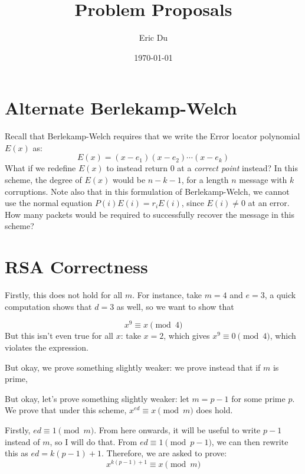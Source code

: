 \documentclass[10pt]{article}
\title{Problem Proposals}
\author{Eric Du}
\date{\today}
\begin{document}
	\maketitle
	
	\section*{Alternate Berlekamp-Welch}
	Recall that Berlekamp-Welch requires that we write the Error locator polynomial $E(x)$ as: 
	\[
	E(x) = (x - e_1)(x - e_2)\cdots(x - e_k)
	\] 
	What if we redefine $E(x)$ to instead return 0 at a \textit{correct point} instead? In this scheme, the 
	degree of $E(x)$ would be $n - k -1$, for a length $n$ message with $k$ corruptions. Note also that in this
	formulation of Berlekamp-Welch, we cannot use the normal equation $P(i)E(i) = r_i E(i)$, since $E(i) \neq 0$
	at an error. How many packets would be required to successfully recover the message in this scheme?

	\section*{RSA Correctness}
Firstly, this does not hold for all $m$. For instance, take $m = 4$ and $e = 3$, a quick computation shows that $d = 3$ as well, so we want to show that 

\[ x^9 \equiv x \pmod 4\]
But this isn't even true for all $x$: take $x = 2$, which gives $x^9 \equiv 0 \pmod 4$, which violates the expression.

But okay, we prove something slightly weaker: we prove instead that if $m$ is prime, 


But okay, let's prove something slightly weaker: let $m = p-1$ for some prime $p$. We prove that under this scheme, $x^{ed} \equiv x \pmod m$ does hold.


Firstly, $ed \equiv 1 \pmod m$. From here onwards, it will be useful to write $p-1$ instead of $m$, so I will do that. From $ed \equiv 1 \pmod{p-1}$, we can then rewrite this as $ed = k(p-1) + 1$. Therefore, we are asked to prove: 
\[ x^{k(p-1) + 1} \equiv x \pmod m\]	
	
\end{document}
